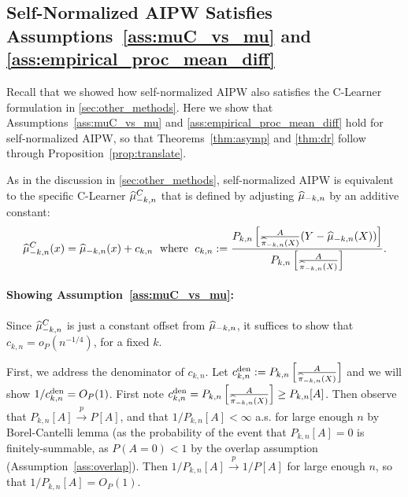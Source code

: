 \subsection{Self-Normalized AIPW Satisfies Assumptions~\ref{ass:muC_vs_mu} and \ref{ass:empirical_proc_mean_diff}}
\label{sec:show_constant_shift}
Recall that we showed how self-normalized AIPW also satisfies the C-Learner formulation in \cref{sec:other_methods}. 
Here we show that Assumptions~\ref{ass:muC_vs_mu} and \ref{ass:empirical_proc_mean_diff} hold for self-normalized 
AIPW, so that Theorems~\ref{thm:asymp} and \ref{thm:dr} follow through Proposition~\ref{prop:translate}. 



As in the discussion in \cref{sec:other_methods}, self-normalized AIPW is equivalent to the specific C-Learner $\widehat{\mu}^C_{-k,n}$ that is defined by adjusting $\widehat{\mu}_{-k,n}$ by an additive constant:
$$\widehat{\mu}^C_{-k,n}(x)=\widehat{\mu}_{-k,n}(x)+c_{k,n}\;\text{ where }\;c_{k,n}:=\frac{P_{k,n}\left[\frac{A}{\widehat{\pi}_{-k,n}(X)}(Y-\widehat{\mu}_{-k,n}(X))\right]}{P_{k,n}\left[\frac{A}{\widehat{\pi}_{-k,n}(X)}\right]}.$$

\paragraph{Showing Assumption~\ref{ass:muC_vs_mu}:}
Since $\widehat{\mu}_{-k,n}^C$
is just a constant offset from $\widehat{\mu}_{-k,n}$, it suffices to show 
that $c_{k,n}=o_P(n^{-1/4})$, for a fixed $k$. 

First, we address the denominator of $c_{k,n}$. Let
$c_{k,n}^{\rm den}:=P_{k,n}\left[\frac{A}{\widehat{\pi}_{-k,n}(X)}\right]$ 
and we will show $1/c_{k,n}^{\rm den}=O_P(1)$. 
First note $c_{k,n}^{\rm den}=P_{k,n}\left[\frac{A}{\widehat{\pi}_{-k,n}(X)}\right] \geq P_{k,n}[A]$. %
Then observe that $P_{k,n}[A]\overset{p}{\to} P[A]$, and that $1/P_{k,n}[A]<\infty$ a.s. for large enough $n$ by Borel-Cantelli lemma (as the probability of the event that $P_{k,n}[A]=0$ is finitely-summable, as $P(A=0)<1$ by the overlap assumption (Assumption~\ref{ass:overlap}). %
Then $1/P_{k,n}[A]\overset{p}{\to} 1/P[A]$ for large enough $n$, 
so that $1/P_{k,n}[A]=O_P(1)$. %

